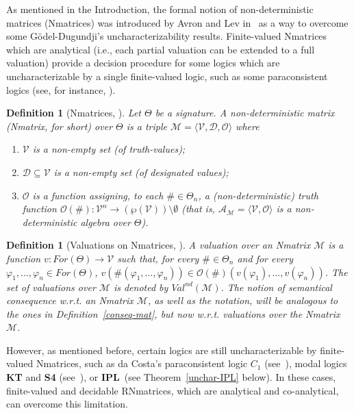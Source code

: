 \documentclass[12pt]{article}
\newtheorem{definition}[theorem]{Definition}
\newcommand{\ipl}{\ensuremath{\mathbf{IPL}}}
\begin{document}
As mentioned in the Introduction, the formal notion of non-deterministic matrices (Nmatrices) was introduced by Avron and Lev in~\cite{avr:lev:01} as a way to overcome some G\"odel-Dugundji's uncharacterizability results. Finite-valued Nmatrices which are analytical (i.e., each partial valuation can be extended to a full valuation) provide a decision procedure for some logics which are uncharacterizable by a single finite-valued logic, such as some paraconsistent logics (see, for instance, \cite{avron:2007}).


\begin{definition}[Nmatrices,  \cite{avr:lev:01}] \label{def:Nmatrix}
    Let $\Theta$ be a signature. A {\em non-deterministic matrix} (Nmatrix, for short) over $\Theta$ is a triple $\mathcal{M} = \langle \mathcal{V},\mathcal{D},\mathcal{O} \rangle$ where 
    \begin{enumerate}
        \item $\mathcal{V}$ is a non-empty set (of truth-values);
        \item $\mathcal{D} \subseteq \mathcal{V}$ is a non-empty set (of designated values);
        \item $\mathcal{O}$ is a function assigning, to each $\# \in\Theta_n$, a  (non-deterministic) truth function $\mathcal{O}(\#) : \mathcal{V}^{n} \rightarrow (\wp(\mathcal{V})) \setminus \emptyset$  (that is, $\mathcal{A}_\mathcal{M}=\langle \mathcal{V},\mathcal{O} \rangle$ is a non-deterministic algebra over $\Theta$).
    \end{enumerate}
\end{definition} 

\begin{definition}[Valuations on Nmatrices,  \cite{avr:lev:01}] \label{conseq-Nmat}
    A  valuation over an Nmatrix $\mathcal{M}$ is a function $v:For(\Theta) \to \mathcal{V}$ such that, for every $\# \in\Theta_n$ and for every $\varphi_1,\ldots,\varphi_n \in For(\Theta)$, $v(\#(\varphi_1, \ldots,\varphi_n)) \in \mathcal{O}(\#)(v(\varphi_1), \ldots,v(\varphi_n))$. The set of valuations over $\mathcal{M}$  is denoted by $Val^{nd}(\mathcal{M})$. The notion of semantical consequence w.r.t. an Nmatrix $\mathcal{M}$, as well as the notation, will be analogous to the ones in Definition~\ref{conseq-mat}, but now w.r.t. valuations over the Nmatrix $\mathcal{M}$.
\end{definition} 


However, as mentioned before, certain logics are still uncharacterizable by finite-valued Nmatrices, such as  
da Costa's paraconsistent logic $C_1$ (see~\cite{avron:2007}), modal logics \textbf{KT} and \textbf{S4} (see~\cite{gratz_truth_2022}), or \ipl\ (see Theorem~\ref{unchar-IPL} below). In these cases, finite-valued and decidable RNmatrices, which are analytical and co-analytical, can overcome this limitation.
\end{document}
